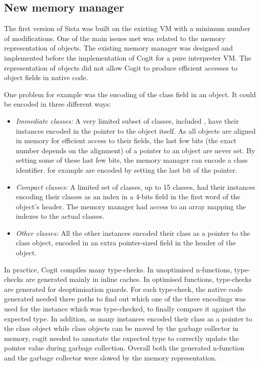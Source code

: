 \documentclass[a4paper,12pt,twoside]{../includes/ThesisStyle}
\begin{document}
\subsection{New memory manager}

The first version of Sista was built on the existing VM with a minimum number of modifications. One of the main issues met was related to the memory representation of objects. The existing memory manager was designed and implemented before the implementation of Cogit for a pure interpreter VM. The representation of objects did not allow Cogit to produce efficient accesses to object fields in native code.

One problem for example was the encoding of the class field in an object. It could be encoded in three different ways:
\begin{itemize}
	\item \emph{Immediate classes:} A very limited subset of classes, included , have their instances encoded in the pointer to the object itself. As all objects are aligned in memory for efficient access to their fields, the last few bits (the exact number depends on the alignment) of a pointer to an object are never set. By setting some of these last few bits, the memory manager can encode a class identifier.  for example are encoded by setting the last bit of the pointer.
	\item \emph{Compact classes:} A limited set of classes, up to 15 classes, had their instances encoding their classes as an index in a 4-bits field in the first word of the object's header. The memory manager had access to an array mapping the indexes to the actual classes.
	\item \emph{Other classes:} All the other instances encoded their class as a pointer to the class object, encoded in an extra pointer-sized field in the header of the object.
\end{itemize}

In practice, Cogit compiles many type-checks. In unoptimised n-functions, type-checks are generated mainly in inline caches. In optimised functions, type-checks are generated for deoptimisation guards. For each type-check, the native code generated needed three paths to find out which one of the three encodings was used for the instance which was type-checked, to finally compare it against the expected type. In addition, as many instances encoded their class as a pointer to the class object while class objects can be moved by the garbage collector in memory, cogit needed to annotate the expected type to correctly update the pointer value during garbage collection. Overall both the generated n-function and the garbage collector were slowed by the memory representation.
\end{document}
